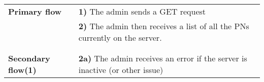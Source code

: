 \documentclass[a4paper,11pt]{article}
\begin{document}
\begin{tabular}{|p{3.5cm}|p{11.5cm}|}
    \\ \hline \rowcolor{Gray} & \\ \hline 
         
    \textbf{Primary flow} & 
    \textbf{1)} The admin sends a GET request \\&
    \textbf{2)} The admin then receives a list of all the PNs currently on the server. \\&
        
    \\ \hline \rowcolor{Gray} & \\ \hline 
         
    \textbf{Secondary flow(1)} & 
    \textbf{2a)} The admin receives an error if the server is inactive (or other issue)
    \\ \hline 
\end{tabular}
\end{document}
